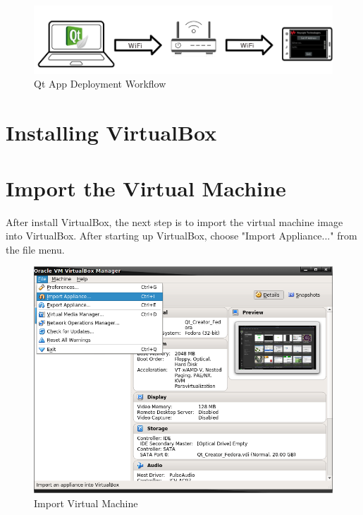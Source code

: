 \documentclass{article}
\begin{document}
	\begin{figure}[H]
		\centering
		\includegraphics[scale=0.5]{pics/Deployment_Workflow.png}
		\caption{Qt App Deployment Workflow}
		\label{Qt_App_Deployment}
	\end{figure}



\section{Installing VirtualBox}




\section{Import the Virtual Machine}

After install VirtualBox, the next step is to import the virtual machine image into VirtualBox. After starting up VirtualBox, choose "Import Appliance..." from the file menu.

	\begin{figure}[H]
		\centering
		\includegraphics[scale=0.35]{pics/VirtualBox_Import_Appliance.png}
		\caption{Import Virtual Machine}
		\label{Import_Virtual_Machine}
	\end{figure}
\end{document}
